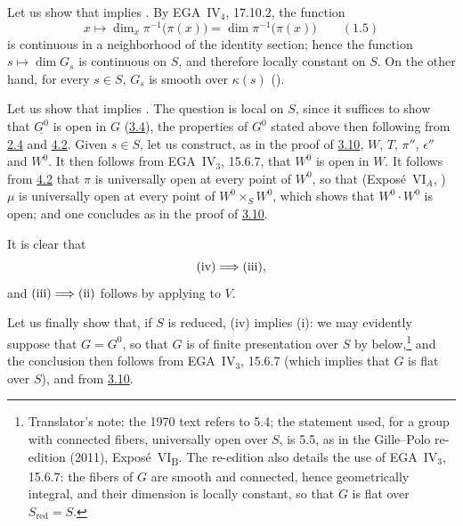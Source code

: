 Let us show that \textup{} implies \textup{}. By
EGA~IV\(_4\), 17.10.2, the function
\[
  x\longmapsto
  \dim_x\pi^{-1}\bigl(\pi(x)\bigr)
    =\dim\pi^{-1}\bigl(\pi(x)\bigr)
  \qquad(\hyperref[lem:sga3-VIB-1.5]{1.5})
\]
is continuous in a neighborhood of the identity section; hence the
function \(s\mapsto\dim G_s\) is continuous on \(S\), and therefore locally
constant on \(S\). On the other hand, for every \(s\in S\), \(G_s\) is
smooth over \(\kappa(s)\) ().

Let us show that \textup{} implies \textup{}. The question
is local on \(S\), since it suffices to show that \(\underline{G^0}\) is open
in \(G\) (\hyperref[case:sga3-VIB-3.4]{3.4}), the properties of \(G^0\) stated above then following
from \hyperref[cor:sga3-VIB-2.4]{2.4} and \hyperref[prop:sga3-VIB-4.2]{4.2}. Given \(s\in S\), let us construct, as in the proof
of \hyperref[thm:sga3-VIB-3.10]{3.10}, \(W\), \(T\), \(\pi''\), \(\epsilon''\) and \(W^0\). It then follows from
EGA~IV\(_3\), 15.6.7, that \(W^0\) is open in \(W\). It follows from
\hyperref[prop:sga3-VIB-4.2]{4.2} that \(\pi\) is universally open at every point of \(W^0\), so that
(Expos\'e~VI\(_A\), ) \(\mu\) is universally open at every point of
\(W^0\times_S W^0\), which shows that \(W^0\cdot W^0\) is open; and one concludes
as in the proof of \hyperref[thm:sga3-VIB-3.10]{3.10}.

It is clear that
\[
  \textup{(iv)}\Longrightarrow\textup{(iii)},
\]
and \(\textup{(iii)}\Longrightarrow\textup{(ii)}\) follows by
applying  to \(V\).

Let us finally show that, if \(S\) is reduced, \textup{(iv)} implies \textup{(i)}: we may
evidently suppose that \(G=G^0\), so that \(G\) is of finite presentation over
\(S\) by  below,\footnote{Translator's note: the 1970 text refers to
5.4; the statement used, for a group with connected fibers, universally open over \(S\), is 5.5, as in the
Gille--Polo re-edition (2011), Expos\'e~VI\textsubscript{B}. The re-edition also details the use of
EGA~IV\(_3\), 15.6.7: the fibers of \(G\) are smooth and connected, hence geometrically integral, and their
dimension is locally constant, so that \(G\) is flat over \(S_{\mathrm{red}}=S\).} and the conclusion then follows from
EGA~IV\(_3\), 15.6.7 (which implies that \(G\) is flat over \(S\)), and from
\hyperref[thm:sga3-VIB-3.10]{3.10}.
